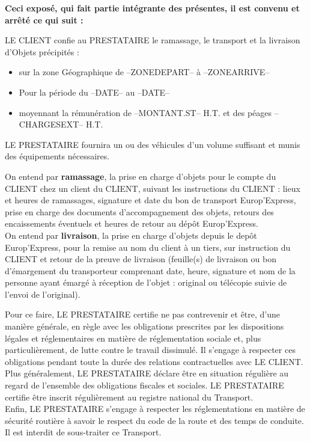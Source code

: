 \textbf{Ceci exposé, qui fait partie intégrante des présentes, il est convenu et arrêté ce qui suit :}\\
\begin{fminipage}
{LE CLIENT confie au PRESTATAIRE le ramassage, le transport et la livraison d'Objets précipités :}
\begin{itemize}
\item[\textbullet]sur la zone Géographique de --ZONEDEPART-- à --ZONEARRIVE--
\item[\textbullet]Pour la période du --DATE-- au --DATE--
\item[\textbullet]moyennant la rémunération de --MONTANT.ST-- H.T. et des péages --CHARGESEXT-- H.T.
\end{itemize}
\end{fminipage}

LE PRESTATAIRE fournira un ou des véhicules d'un volume suffisant et munis des équipements nécessaires.

On entend par \textbf{ramassage}, la prise en charge d'objets pour le compte du CLIENT chez un client du CLIENT, suivant les instructions du CLIENT : lieux et heures de ramassages, signature et date du bon de transport Europ'Express, prise en charge des documents d'accompagnement des objets, retours des encaissements éventuels et heures de retour au dépôt Europ'Express.\\
On entend par \textbf{livraison}, la prise en charge d'objets depuis le depôt Europ'Express, pour la remise au nom du client à un tiers, sur instruction du CLIENT et retour de la preuve de livraison (feuille(s) de livraison ou bon d'émargement du transporteur comprenant date, heure, signature et nom de la personne ayant émargé à réception de l'objet : original ou télécopie suivie de l'envoi de l'original).

Pour ce faire, LE PRESTATAIRE certifie ne pas contrevenir et être, d'une manière générale, en règle avec les obligations prescrites par les dispositions légales et réglementaires en matière de réglementation sociale et, plus particulièrement, de lutte contre le travail dissimulé. Il s'engage à respecter ces obligations pendant toute la durée des relations contractuelles avec LE CLIENT. Plus généralement, LE PRESTATAIRE déclare être en situation régulière au regard de l'ensemble des obligations fiscales et sociales. LE PRESTATAIRE certifie être inscrit régulièrement au registre national du Transport.\\
Enfin, LE PRESTATAIRE s'engage à respecter les réglementations en matière de sécurité routière à savoir le respect du code de la route et des temps de conduite.\\
Il est interdit de sous-traiter ce Transport.

